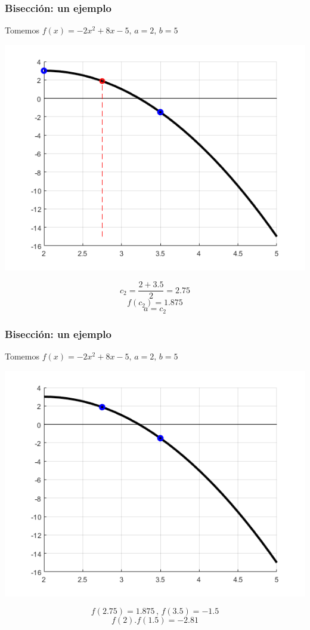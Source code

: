 \documentclass[xcolor=svgnames]{beamer} %
\theoremstyle{plain}
\theoremstyle{definition}
\begin{document}
\begin{frame}
\frametitle{Bisección: un ejemplo}
Tomemos $f(x) = -2x^2+8x-5, \, a=2, \, b=5$
\begin{minipage}{.7\linewidth}
\includegraphics[scale=.5]{Biseccion/f3.png} 
\end{minipage}
\begin{minipage}{.25\linewidth}
$$c_2 = \frac{2+3.5}{2} = 2.75 $$\vspace{7pt}
$$f(c_2) = 1.875 $$\vspace{7pt}
$$ a = c_2$$

\end{minipage}
\end{frame}


\begin{frame}
\frametitle{Bisección: un ejemplo}
Tomemos $f(x) = -2x^2+8x-5, \, a=2, \, b=5$
\begin{minipage}{.7\linewidth}
\includegraphics[scale=.5]{Biseccion/f4.png} 
\end{minipage}
\begin{minipage}{.25\linewidth}
$$f(2.75)=1.875 \,,\,f(3.5)=-1.5$$\vspace{7pt}
$$f(2).f(1.5) = -2.81$$\vspace{7pt}
\end{minipage}
\end{frame}
\end{document}
